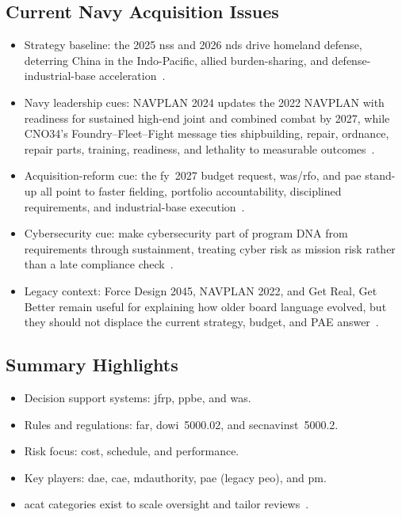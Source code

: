 \documentclass[../main.tex]{subfiles}
\begin{document}
\subsection{Current Navy Acquisition Issues}
\begin{itemize}
  \item Strategy baseline: the 2025 \ac{nss} and 2026 \ac{nds} drive homeland defense, deterring China in the Indo-Pacific, allied burden-sharing, and defense-industrial-base acceleration~\autocite{NSS-2025,NDS-2026}.
  \item Navy leadership cues: NAVPLAN 2024 updates the 2022 NAVPLAN with readiness for sustained high-end joint and combined combat by 2027, while CNO34's Foundry--Fleet--Fight message ties shipbuilding, repair, ordnance, repair parts, training, readiness, and lethality to measurable outcomes~\autocite{NAVPLAN2024,cno34-day-one-message-2025}.
  \item Acquisition-reform cue: the \ac{fy}~2027 budget request, \ac{was}/\ac{rfo}, and \ac{pae} stand-up all point to faster fielding, portfolio accountability, disciplined requirements, and industrial-base execution~\autocite{DON-FY27-Budget-Request-2026,secwar-acq-transformation-2025,DON-PAE-Establishment-2026,DON-PAE-Expansion-May2026}.
  \item Cybersecurity cue: make cybersecurity part of program DNA from requirements through sustainment, treating cyber risk as mission risk rather than a late compliance check~\autocite{DON-CyberStrategy-2023,DoDI5000-90}.
  \item Legacy context: Force Design 2045, NAVPLAN 2022, and Get Real, Get Better remain useful for explaining how older board language evolved, but they should not displace the current strategy, budget, and PAE answer~\autocite{NAVPLAN2022,edo-3-3-1-acq-policy-players-2025}.
\end{itemize}

\subsection{Summary Highlights}
\begin{itemize}
  \item Decision support systems: \ac{jfrp}, \ac{ppbe}, and \ac{was}.
  \item Rules and regulations: \ac{far}, \ac{dowi}~5000.02, and \ac{secnavinst}~5000.2.
  \item Risk focus: cost, schedule, and performance.
  \item Key players: \ac{dae}, \ac{cae}, \ac{mdauthority}, \ac{pae} (legacy \ac{peo}), and \ac{pm}.
  \item \ac{acat} categories exist to scale oversight and tailor reviews~\autocite{edo-3-3-1-acq-policy-players-2025}.
\end{itemize}
\end{document}
